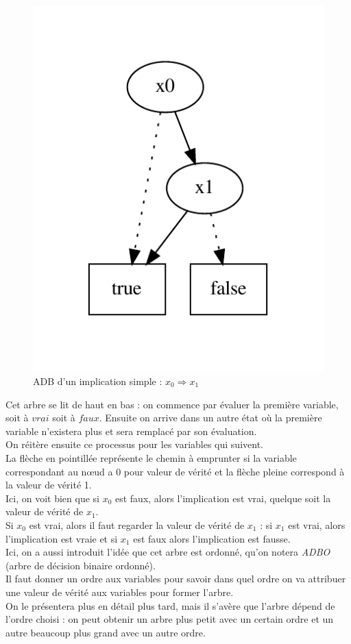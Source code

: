\documentclass[a4paper, oneside]{report}
\begin{document}
\begin{figure}[htbp]
  \centering
  \includegraphics[trim = 0cm 1.5cm 0cm 1cm , scale=0.6]{exemple/impl_simple}
  \caption{ADB d'un implication simple : $x_0 \Rightarrow x_1$}
\end{figure}
Cet arbre se lit de haut en bas : on commence par évaluer la première variable, soit à $vrai$ soit à $faux$. Ensuite on arrive dans un autre état où la première variable n'existera plus et sera remplacé par son évaluation.\\
On réitère ensuite ce processus pour les variables qui suivent.\\
La flèche en pointillée représente le chemin à emprunter si la variable correspondant au nœud a 0 pour valeur de vérité et la flèche pleine correspond à la valeur de vérité 1.\\
Ici, on voit bien que si $x_0$ est faux, alors l'implication est vrai, quelque soit la valeur de vérité de $x_1$.\\
Si $x_0$ est vrai, alors il faut regarder la valeur de vérité de $x_1$ : si $x_1$ est vrai, alors l'implication est vraie et si $x_1$ est faux alors l'implication est fausse.\\

Ici, on a aussi introduit l'idée que cet arbre est ordonné, qu'on notera \textit{ADBO} (arbre de décision binaire ordonné).\\
Il faut donner un ordre aux variables pour savoir dans quel ordre on va attribuer une valeur de vérité aux variables pour former l'arbre.\\
On le présentera plus en détail plus tard, mais il s'avère que l'arbre dépend de l'ordre choisi : on peut obtenir un arbre plus petit avec un certain ordre et un autre beaucoup plus grand avec un autre ordre.\\
\end{document}
